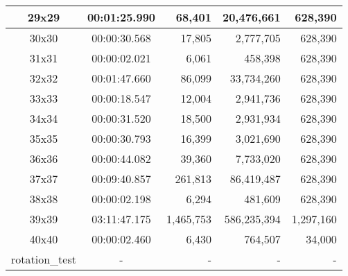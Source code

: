 \begin{center}
\begin{tabular}{|c|c|r|r|r|}
		29x29 & 00:01:25.990 & 68,401 & 20,476,661 & 628,390 \\ \hline
		30x30 & 00:00:30.568 & 17,805 & 2,777,705 & 628,390 \\ \hline
		31x31 & 00:00:02.021 & 6,061 & 458,398 & 628,390 \\ \hline
		32x32 & 00:01:47.660 & 86,099 & 33,734,260 & 628,390 \\ \hline
		33x33 & 00:00:18.547 & 12,004 & 2,941,736 & 628,390 \\ \hline
		34x34 & 00:00:31.520 & 18,500 & 2,931,934 & 628,390 \\ \hline
		35x35 & 00:00:30.793 & 16,399 & 3,021,690 & 628,390 \\ \hline
		36x36 & 00:00:44.082 & 39,360 & 7,733,020 & 628,390 \\ \hline
		37x37 & 00:09:40.857 & 261,813 & 86,419,487 & 628,390 \\ \hline
		38x38 & 00:00:02.198 & 6,294 & 481,609 & 628,390 \\ \hline
		39x39 & 03:11:47.175 & 1,465,753 & 586,235,394 & 1,297,160 \\ \hline
		40x40 & 00:00:02.460 & 6,430 & 764,507 & 34,000 \\ \hline
		rotation\_test & - & - & - & - \\ \hline

    \end{tabular}
\end{center}
